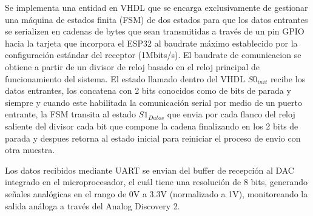         Se implementa una entidad en VHDL que se encarga exclusivamente de gestionar una máquina de estados finita (FSM) de dos estados para que los datos entrantes se serializen en cadenas de bytes que sean transmitidas a través de un pin GPIO hacia la tarjeta que incorpora el ESP32 al baudrate máximo establecido por la configuración estándar del receptor (1Mbits/s). El baudrate de comunicacion se obtiene a partir de un divisor de reloj basado en el reloj principal de funcionamiento del sistema. El estado llamado dentro del VHDL $S0_{init}$ recibe los datos entrantes, los concatena con 2 bits conocidos como de bits de parada y siempre y cuando este habilitada la comunicación serial por medio de un puerto entrante, la FSM transita al estado $S1_{Datos}$ que envia por cada flanco del reloj saliente del divisor cada bit que compone la cadena finalizando en los 2 bits de parada y despues retorna al estado inicial para reiniciar el proceso de envio con otra muestra.
        
        Los datos recibidos mediante UART se envian del buffer de recepción al DAC integrado en el microprocesador, el cuál tiene una resolución de 8 bits, generando señales analógicas en el rango de 0V a 3.3V (normalizado a 1V), monitoreando la salida análoga a través del Analog Discovery 2.        

    






